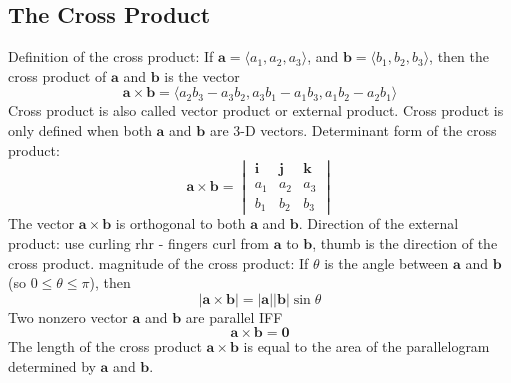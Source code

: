 \documentclass{article}
\begin{document}
    \subsection{The Cross Product}
    \begin{outline}
        \1 Definition of the cross product: If \(\mathbf a=\langle a_1,a_2,a_3\rangle\), and \(\mathbf b=\langle b_1,b_2,b_3\rangle\), then the cross product of \(\mathbf a\) and \(\mathbf b\) is the vector \[\mathbf{a\times b}=\langle a_2b_3-a_3b_2,a_3b_1-a_1b_3,a_1b_2-a_2b_1\rangle\]
        \1 Cross product is also called vector product or external product. 
        \1 Cross product is only defined when both \(\mathbf a\) and \(\mathbf b\) are 3-D vectors. 
        \1 Determinant form of the cross product: \[\mathbf{a\times b}=\begin{vmatrix}
            \mathbf i & \mathbf j & \mathbf k\\
            a_1 & a_2 & a_3\\
            b_1 & b_2 & b_3
        \end{vmatrix}\]
        \1 The vector \(\mathbf{a\times b}\) is orthogonal to both \(\mathbf a\) and \(\mathbf b\). 
        \1 Direction of the external product: use curling rhr - fingers curl from \(\mathbf a\) to \(\mathbf b\), thumb is the direction of the cross product. 
        \1 magnitude of the cross product: If \(\theta\) is the angle between \(\mathbf a\) and \(\mathbf b\) (so \(0\leq\theta\leq\pi\)), then \[|\mathbf{a\times b}|=|\mathbf a||\mathbf b|\sin\theta\]
        \1 Two nonzero vector \(\mathbf a\) and \(\mathbf b\) are parallel IFF \[\mathbf{a\times b}=\mathbf 0\]
        \1 The length of the cross product \(\mathbf{a\times b}\) is equal to the area of the parallelogram determined by \(\mathbf a\) and \(\mathbf b\). 
    \end{outline}
\end{document}
